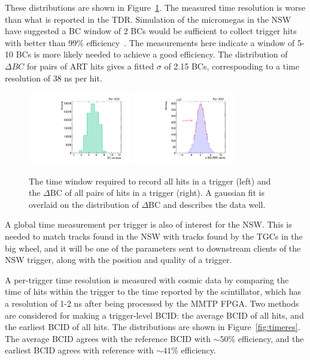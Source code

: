 These distributions are shown in Figure~\ref{fig:time}. The measured time resolution is worse than what is reported in the TDR. Simulation of the micromegas in the NSW have suggested a BC window of 2 BCs would be sufficient to collect trigger hits with better than 99\% efficiency~\cite{koki}. The measurements here indicate a window of 5-10 BCs is more likely needed to achieve a good efficiency. The distribution of $\Delta BC$ for pairs of ART hits gives a fitted $\sigma$ of 2.15 BCs, corresponding to a time resolution of 38 ns per hit.

\begin{figure}[!htpb]
  \begin{center}
    \includegraphics[width=0.4\textwidth]{figures/gbtanalysis3522/artwin_lin.pdf}
    \includegraphics[width=0.4\textwidth]{figures/gbtanalysis3522/artrpairs_lin.pdf}
  \end{center}
  \vspace{-10pt}
  \caption{The time window required to record all hits in a trigger (left) and the $\Delta\text{BC}$ of all pairs of hits in a trigger (right). A gaussian fit is overlaid on the distribution of $\Delta\text{BC}$ and describes the data well.}
  \label{fig:time}
\end{figure}

A global time measurement per trigger is also of interest for the NSW. This is needed to match tracks found in the NSW with tracks found by the TGCs in the big wheel, and it will be one of the parameters sent to downstream clients of the NSW trigger, along with the position and quality of a trigger.

A per-trigger time resolution is measured with cosmic data by comparing the time of hits within the trigger to the time reported by the scintillator, which has a resolution of 1-2 ns after being processed by the MMTP FPGA. Two methods are considered for making a trigger-level BCID: the average BCID of all hits, and the earliest BCID of all hits. The distributions are shown in Figure~\ref{fig:timeres}. The average BCID agrees with the reference BCID with $\sim\!50\%$ efficiency, and the earliest BCID agrees with reference with $\sim\!41\%$ efficiency.

